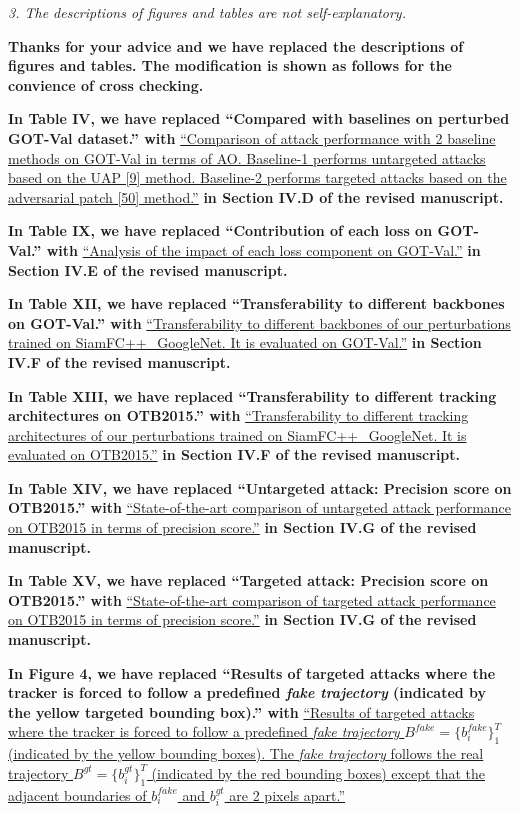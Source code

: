 \documentclass[12pt]{article}
\begin{document}
\textit{3. The descriptions of figures and tables are not self-explanatory.}

\textbf{Thanks for your advice and we have replaced the descriptions of figures and tables. The modification is shown as follows for the convience of cross checking.}

\textbf{In Table IV, we have replaced ``Compared with baselines on perturbed GOT-Val dataset.'' with}
\uline{``Comparison of attack performance with 2 baseline methods on GOT-Val in terms of AO. Baseline-1 performs untargeted attacks based on the UAP [9] method. Baseline-2 performs targeted attacks based on the adversarial patch [50] method.''}
\textbf{in Section IV.D of the revised manuscript.}

\textbf{In Table IX, we have replaced ``Contribution of each loss on GOT-Val.'' with}
\uline{``Analysis of the impact of each loss component on GOT-Val.''}
\textbf{in Section IV.E of the revised manuscript.}

\textbf{In Table XII, we have replaced ``Transferability to different backbones on GOT-Val.'' with}
\uline{``Transferability to different backbones of our perturbations trained on SiamFC++\_GoogleNet. It is evaluated on GOT-Val.''}
\textbf{in Section IV.F of the revised manuscript.}

\textbf{In Table XIII, we have replaced ``Transferability to different tracking architectures on OTB2015.'' with}
\uline{``Transferability to different tracking architectures of our perturbations trained on SiamFC++\_GoogleNet. It is evaluated on OTB2015.''}
\textbf{in Section IV.F of the revised manuscript.}

\textbf{In Table XIV, we have replaced ``Untargeted attack: Precision score on OTB2015.'' with}
\uline{``State-of-the-art comparison of untargeted attack performance on OTB2015 in terms of precision score.''}
\textbf{in Section IV.G of the revised manuscript.}

\textbf{In Table XV, we have replaced ``Targeted attack: Precision score on OTB2015.'' with}
\uline{``State-of-the-art comparison of targeted attack performance on OTB2015 in terms of precision score.''}
\textbf{in Section IV.G of the revised manuscript.}

\textbf{In Figure 4, we have replaced ``Results of targeted attacks where the tracker is forced to follow a predefined \textit{fake trajectory} (indicated by the yellow targeted bounding box).'' with}
\uline{``Results of targeted attacks where the tracker is forced to follow a predefined \textit{fake trajectory} $B^{fake}=\{b^{fake}_i\}_1^{T}$ (indicated by the yellow bounding boxes). The \textit{fake trajectory} follows the real trajectory $B^{gt}=\{b^{gt}_i\}_1^T$ (indicated by the red bounding boxes) except that the adjacent boundaries of $b^{fake}_i$ and $b^{gt}_i$ are 2 pixels apart.''}
\end{document}
